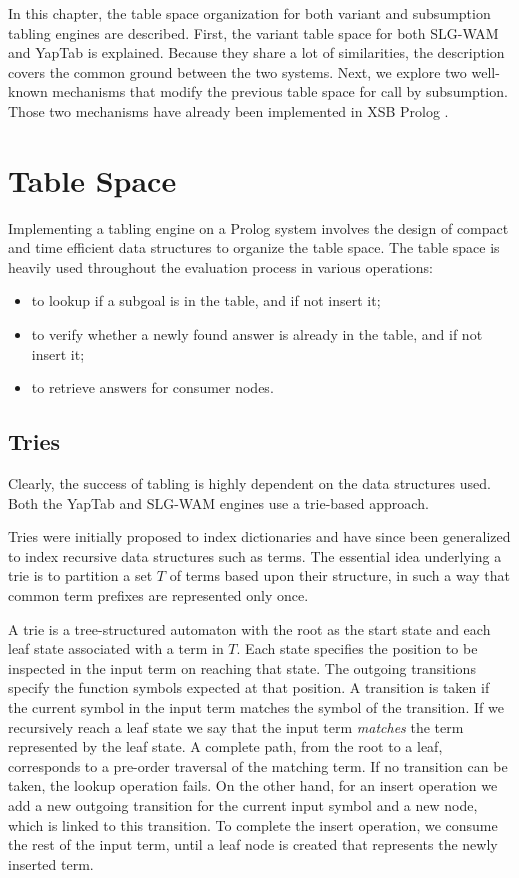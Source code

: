 
In this chapter, the table space organization for both variant and subsumption tabling
engines are described. First, the variant table space for both SLG-WAM and YapTab is
explained. Because they share a lot of similarities, the description covers the common
ground between the two systems. Next, we explore two well-known mechanisms that modify
the previous table space for call by subsumption. Those two mechanisms have already been
implemented in XSB Prolog \cite{Rao-96, Johnson-99}.

\section{Table Space} \label{sec:table_space}

Implementing a tabling engine on a Prolog system involves the design of compact and time efficient data structures
to organize the table space. The table space is heavily used throughout the evaluation process in various operations:

\begin{itemize}
  \item to lookup if a subgoal is in the table, and if not insert it;
  \item to verify whether a newly found answer is already in the table, and if not insert it;
  \item to retrieve answers for consumer nodes.
\end{itemize}

\subsection{Tries}

Clearly, the success of tabling is highly dependent on the data structures used.
Both the YapTab \cite{Rocha-00a} and SLG-WAM \cite{RamakrishnanIV-95} engines use a trie-based approach.

Tries were initially proposed to index dictionaries \cite{Fredkin-62} and have since been generalized to index recursive data structures
such as terms. The essential idea underlying a trie is to partition a set $T$ of terms based upon their structure,
in such a way that common term prefixes are represented only once.

A trie is a tree-structured automaton with the root as the start state and each leaf state associated with a term in $T$.
Each state specifies the position to be inspected in the input term on reaching that state.
The outgoing transitions specify the function symbols expected at that position.
A transition is taken if the current symbol in the input term matches the symbol of the transition.
If we recursively reach a leaf state we say that the input term \textit{matches} the term represented by the leaf state.
A complete path, from the root to a leaf, corresponds to a pre-order traversal of the matching term.
If no transition can be taken, the lookup operation fails. On the other hand, for an insert operation
we add a new outgoing transition for the current input symbol and a new node, which is linked to this transition.
To complete the insert operation, we consume the rest of the input term, until a leaf node is created that represents
the newly inserted term.

